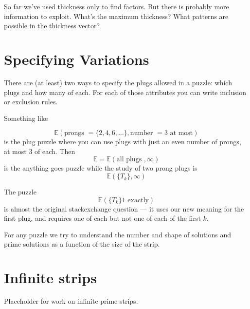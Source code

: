 \documentclass[10pt]{article}
\numberwithin{equation}{section}
\newenvironment{anote}
               {{\textcolor{blue}{Note:}}
                 \itshape
               }
               {}
\begin{document}
\begin{anote}
So far we've used thickness only to find factors. But there is
probably more information to exploit. What's the maximum thickness?
What patterns are possible in the thickness vector?
\end{anote}

\section{Specifying Variations}

There are (at least) two ways to specify the plugs allowed in a
puzzle: which plugs and how many of each. For each of those
attributes you can write inclusion or exclusion rules.

Something like

\begin{equation*}
\mathbb{E}(\text{prongs } = \{2, 4, 6, \ldots\}, \text{number } = 3
\text{ at most})
\end{equation*}
is the plug puzzle where you can use plugs with just an
even number of prongs, at most  $3$ of each. Then
\begin{equation*}
  \mathbb{E}  = \mathbb{E}(\text{all plugs },\infty)
\end{equation*}
is the anything goes puzzle while
the study of two prong plugs is
\begin{equation*}
    \mathbb{E}(\{T_k\}, \infty)
\end{equation*}

The puzzle
\begin{equation*}
  \mathbb{E}(\{T_k\} 1 \text{ exactly})
\end{equation*}
is almost the original stackexchange question --- it uses  our new
meaning for the first plug, and requires one of each but not one of
each of the first $k$.


For any puzzle we try to understand the number and shape of solutions
and prime solutions as a function of the size of the strip.
\section{Infinite strips}

\begin{anote}
Placeholder for work on infinite prime strips.
\end{anote}

%
\end{document}
